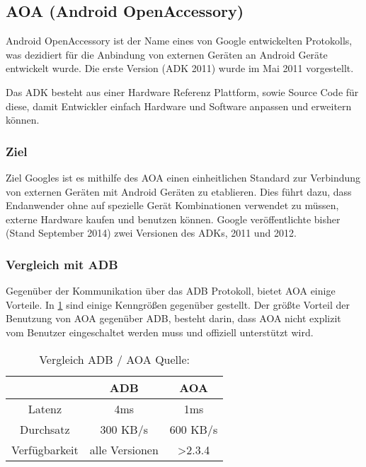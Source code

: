\documentclass[12pt,journal,compsoc]{IEEEtran}
\begin{document}
\subsection{AOA (Android OpenAccessory)}
Android OpenAccessory ist der Name eines von Google entwickelten Protokolls, was 
dezidiert für die Anbindung von externen Geräten an Android Geräte entwickelt wurde.
Die erste Version (ADK 2011) wurde im Mai 2011 vorgestellt.

Das ADK besteht aus einer Hardware Referenz Plattform, sowie Source Code für diese, damit 
Entwickler einfach Hardware und Software anpassen und erweitern können.
\cite{developaoa}
\subsubsection{Ziel}
Ziel Googles ist es mithilfe des AOA einen einheitlichen Standard zur Verbindung von externen Geräten mit Android Geräten zu etablieren.
Dies führt dazu, dass Endanwender ohne auf spezielle Gerät Kombinationen verwendet zu müssen, externe Hardware kaufen und benutzen können.
Google veröffentlichte bisher (Stand September 2014) zwei Versionen des ADKs, 2011 und 2012. 

\subsubsection{Vergleich mit ADB}
Gegenüber der Kommunikation über das ADB Protokoll, bietet AOA einige Vorteile. In \ref{table:vergl} sind einige Kenngrößen gegenüber gestellt. Der größte Vorteil der Benutzung von AOA gegenüber ADB, besteht darin, dass AOA nicht explizit vom Benutzer eingeschaltet werden muss und offiziell unterstützt wird.


\begin{table}
	\centering
	\caption{Vergleich ADB / AOA Quelle: \cite{comp}}
	\label{table:vergl}
	\begin{tabular}{c | c | c}
		& ADB & AOA \\ \hline
		Latenz & 4ms & 1ms \\ \hline
		Durchsatz & 300 KB/s & 600 KB/s \\ \hline
		Verfügbarkeit & alle Versionen & \textgreater 2.3.4 \\ \hline
	\end{tabular}
\end{table}
\end{document}

